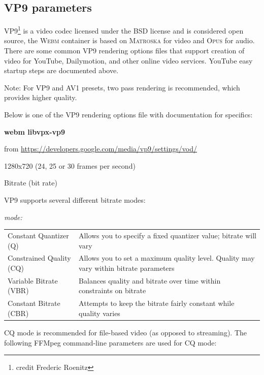 \subsection{VP9 parameters}%
\label{sub:vp9_parameters}

\textsc{VP9}\protect\footnote{credit Frederic Roenitz} is a video codec licensed under the BSD license and is
considered open source,
the \textsc{Webm} container is based on \textsc{Matroska} for video
and \textsc{Opus} for audio. There are some common \textsc{VP9} rendering
options files that support creation of video for YouTube,
Dailymotion, and other online video services. YouTube easy startup steps are documented above.

Note: For VP9 and AV1 presets, two pass rendering is recommended, which provides higher quality.

Below is one of the \textsc{VP9} rendering options file with documentation for specifics:

\textbf{webm libvpx-vp9}

from {\small \url{https://developers.google.com/media/vp9/settings/vod/}}

1280x720 (24, 25 or 30 frames per second)

Bitrate (bit rate)

\textsc{VP9} supports several different bitrate modes:

\textit{mode:}

\begin{tabular}{p{6cm}p{10cm}}
	\hline
	Constant Quantizer (Q) & Allows you to specify a fixed quantizer value; bitrate will vary \\
	Constrained Quality (CQ) & Allows you to set a maximum quality level. Quality may vary within bitrate parameters\\
	Variable Bitrate (VBR) & Balances quality and bitrate over time within constraints on bitrate\\
	Constant Bitrate (CBR) & Attempts to keep the bitrate fairly constant while quality varies\\
	\hline
\end{tabular}

CQ mode is recommended for file-based video (as opposed to streaming). The following FFMpeg command-line parameters are used for CQ mode:

